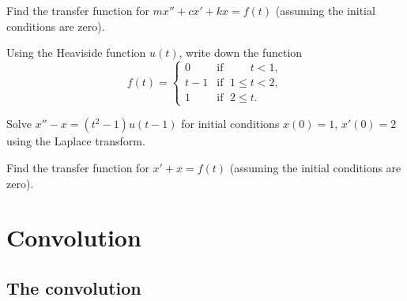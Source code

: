 \begin{exercise}
Find the transfer function for 
$m x'' + c x' + kx = f(t)$
(assuming the initial conditions are zero).
\end{exercise}

\setcounter{exercise}{100}

\begin{exercise}
Using the Heaviside function $u(t)$, write down the function
\begin{equation*}
f(t) =
\begin{cases}
0 & \text{if } \; \phantom{1 \leq {}} t < 1  , \\
t-1 & \text{if } \; 1 \leq t < 2 , \\
1 & \text{if } \; 2 \leq t .
\end{cases}
\end{equation*}
\end{exercise}

\begin{exercise}
Solve $x''-x = (t^2-1) u(t-1)$ for initial conditions $x(0)=1$, $x'(0) = 2$
using the Laplace transform.
\end{exercise}
 
\begin{exercise}
Find the transfer function for 
$x' + x = f(t)$
(assuming the initial conditions are zero).
\end{exercise}


\sectionnewpage
\section{Convolution}
\label{convolution:section}


\subsection{The convolution}


